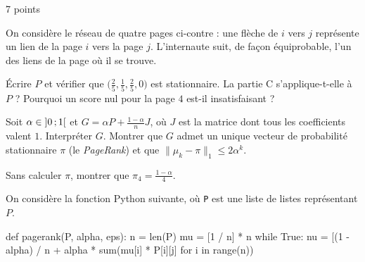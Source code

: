 \begin{exoEval}{7 points}{}
\noindent\begin{minipage}[c]{0.62\linewidth}
On considère le réseau de quatre pages ci-contre : une flèche de $i$ vers
$j$ représente un lien de la page $i$ vers la page $j$. L'internaute suit,
de façon équiprobable, l'un des liens de la page où il se trouve.
\end{minipage}\hfill
\begin{minipage}[c]{0.34\linewidth}\centering
{}
\end{minipage}\par\vspace{1mm}
\begin{questions}[start=9]
  \item Écrire $P$ et vérifier que $\bigl(\frac25,\frac15,\frac25,0\bigr)$ est
    stationnaire. La partie C s'applique-t-elle à $P$ ? Pourquoi un score
    nul pour la page $4$ est-il insatisfaisant ?
  \item Soit $\alpha\in\mathopen{]}0\,{;}\,1\mathclose{[}$ et $G=\alpha P+\frac{1-\alpha}{n}J$, où $J$
    est la matrice dont tous les coefficients valent $1$. Interpréter $G$.
    Montrer que $G$ admet un unique vecteur de probabilité stationnaire
    $\pi$ (le \emph{PageRank}) et que
    $\lVert\mu_k-\pi\rVert_1\leqslant2\alpha^{k}$.
  \item Sans calculer $\pi$, montrer que $\pi_4=\frac{1-\alpha}{4}$.
  \item On considère la fonction Python suivante, où \texttt{P} est une
    liste de listes représentant $P$.
\begin{python}
def pagerank(P, alpha, eps):
    n = len(P)
    mu = [1 / n] * n
    while True:
        nu = [(1 - alpha) / n
              + alpha * sum(mu[i] * P[i][j] for i in range(n))

\end{python}
\end{questions}
\end{exoEval}

